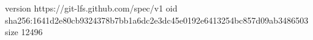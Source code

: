 version https://git-lfs.github.com/spec/v1
oid sha256:1641d2e80cb9324378b7bb1a6dc2e3dc45e0192e6413254bc857d09ab3486503
size 12496
